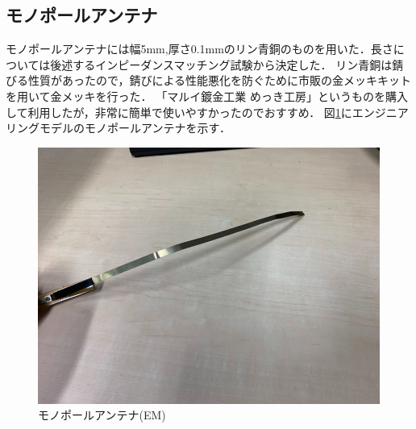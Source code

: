 \subsection{モノポールアンテナ}
モノポールアンテナには幅5mm,厚さ0.1mmのリン青銅のものを用いた．長さについては後述するインピーダンスマッチング試験から決定した．
リン青銅は錆びる性質があったので，錆びによる性能悪化を防ぐために市販の金メッキキットを用いて金メッキを行った．
「マルイ鍍金工業 めっき工房」というものを購入して利用したが，非常に簡単で使いやすかったのでおすすめ．
図\ref{fig4-7-0}にエンジニアリングモデルのモノポールアンテナを示す．
\begin{figure}[H]
	\centering
	\includegraphics[scale=0.5]{04/fig/4-7-0.jpg}
	\caption{モノポールアンテナ(EM)}
	\label{fig4-7-0}
\end{figure}

